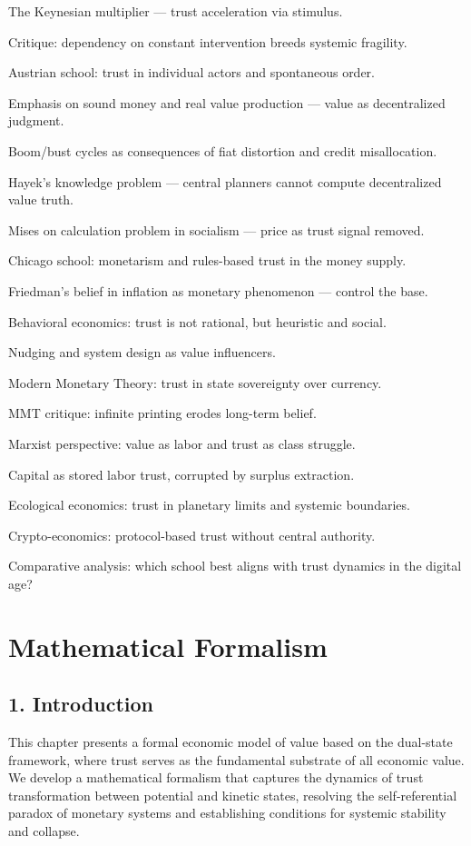 \documentclass[11pt,oneside]{book}
\begin{document}
The Keynesian multiplier — trust acceleration via stimulus.

Critique: dependency on constant intervention breeds systemic fragility.

Austrian school: trust in individual actors and spontaneous order.

Emphasis on sound money and real value production — value as decentralized judgment.

Boom/bust cycles as consequences of fiat distortion and credit misallocation.

Hayek’s knowledge problem — central planners cannot compute decentralized value truth.

Mises on calculation problem in socialism — price as trust signal removed.

Chicago school: monetarism and rules-based trust in the money supply.

Friedman’s belief in inflation as monetary phenomenon — control the base.

Behavioral economics: trust is not rational, but heuristic and social.

Nudging and system design as value influencers.

Modern Monetary Theory: trust in state sovereignty over currency.

MMT critique: infinite printing erodes long-term belief.

Marxist perspective: value as labor and trust as class struggle.

Capital as stored labor trust, corrupted by surplus extraction.

Ecological economics: trust in planetary limits and systemic boundaries.

Crypto-economics: protocol-based trust without central authority.

Comparative analysis: which school best aligns with trust dynamics in the digital age?



\appendix
\chapter{ Mathematical Formalism}

\section{1. Introduction}

This chapter presents a formal economic model of value based on the dual-state framework, where trust serves as the fundamental substrate of all economic value. We develop a mathematical formalism that captures the dynamics of trust transformation between potential and kinetic states, resolving the self-referential paradox of monetary systems and establishing conditions for systemic stability and collapse.
\end{document}
